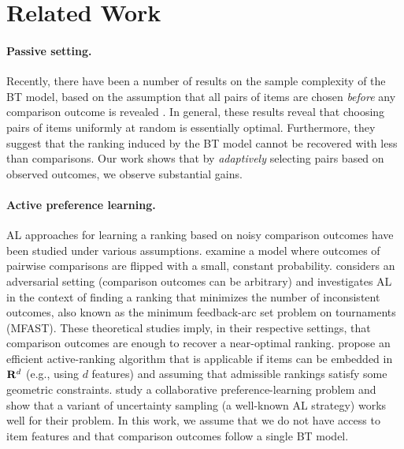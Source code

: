\section{Related Work}  %
\label{sec:relwork}

\paragraph{Passive setting.}
Recently, there have been a number of results on the sample complexity of the BT model, based on the assumption that all pairs of items are chosen \emph{before} any comparison outcome is revealed
\citep{negahban2012iterative, hajek2014minimax, rajkumar2014statistical, vojnovic2016parameter}.
In general, these results reveal that choosing pairs of items uniformly at random is essentially optimal.
Furthermore, they suggest that the ranking induced by the BT model cannot be recovered with less than  comparisons.
Our work shows that by \emph{adaptively} selecting pairs based on observed outcomes, we observe substantial gains.

\paragraph{Active preference learning.}
AL approaches for learning a ranking based on noisy comparison outcomes have been studied under various assumptions.
\citet{braverman2008noisy} examine a model where outcomes of pairwise comparisons are flipped with a small, constant probability.
\citet{ailon2012active} considers an adversarial setting (comparison outcomes can be arbitrary) and investigates AL in the context of finding a ranking that minimizes the number of inconsistent outcomes, also known as the minimum feedback-arc set problem on tournaments (MFAST).
These theoretical studies imply, in their respective settings, that  comparison outcomes are enough to recover a near-optimal ranking.
\citet{jamieson2011active} propose an efficient active-ranking algorithm that is applicable if items can be embedded in $\mathbf{R}^d$ (e.g., using $d$ features) and assuming that admissible rankings satisfy some geometric constraints.
\citet{wang2014active} study a collaborative preference-learning problem and show that a variant of uncertainty sampling (a well-known AL strategy) works well for their problem.
In this work, we assume that we do not have access to item features and that comparison outcomes follow a single BT model.

